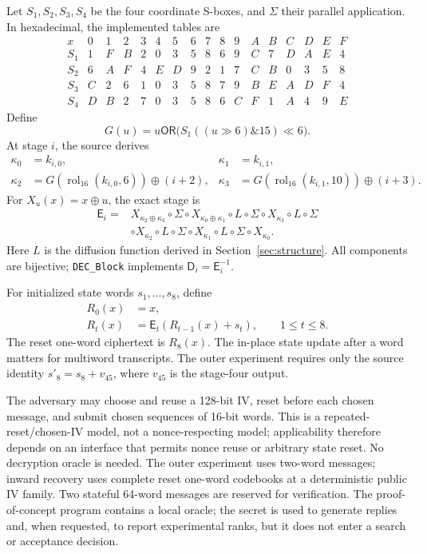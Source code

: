 \documentclass[10pt]{article}
\theoremstyle{plain}
\theoremstyle{definition}
\theoremstyle{remark}
\newcommand{\xor}{\mathbin{\oplus}}
\newcommand{\OR}{\mathbin{\mathsf{OR}}}
\newcommand{\E}{\mathsf E}
\newcommand{\D}{\mathsf D}
\newcommand{\rol}{\operatorname{rol}_{16}}
\newcommand{\code}[1]{\texttt{#1}}
\begin{document}
Let \(S_1,S_2,S_3,S_4\) be the four coordinate S-boxes, and \(\Sigma\) their
parallel application.  In hexadecimal, the implemented tables are
\[
\begin{array}{c|*{16}{c}}
x&0&1&2&3&4&5&6&7&8&9&A&B&C&D&E&F\\\hline
S_1&1&F&B&2&0&3&5&8&6&9&C&7&D&A&E&4\\
S_2&6&A&F&4&E&D&9&2&1&7&C&B&0&3&5&8\\
S_3&C&2&6&1&0&3&5&8&7&9&B&E&A&D&F&4\\
S_4&D&B&2&7&0&3&5&8&6&C&F&1&A&4&9&E
\end{array}
\]
Define
\begin{equation}
G(u)=u\OR\bigl(S_1((u\mathbin{\gg}6)\mathbin{\&}15)\mathbin{\ll}6\bigr).
\label{eq:G}
\end{equation}
At stage \(i\), the source derives
\begin{align}
\kappa_0&=k_{i,0},&\kappa_1&=k_{i,1},\nonumber\\
\kappa_2&=G(\rol(k_{i,0},6))\xor(i+2),&
\kappa_3&=G(\rol(k_{i,1},10))\xor(i+3).
\label{eq:derive}
\end{align}
For \(X_u(x)=x\xor u\), the exact stage is
\begin{align}
\E_i={}&X_{\kappa_2\xor\kappa_3}\circ\Sigma
\circ X_{\kappa_0\xor\kappa_1}\circ L\circ\Sigma
\circ X_{\kappa_3}\circ L\circ\Sigma\nonumber\\
&\circ X_{\kappa_2}\circ L\circ\Sigma
\circ X_{\kappa_1}\circ L\circ\Sigma\circ X_{\kappa_0}.
\label{eq:stage}
\end{align}
Here \(L\) is the diffusion function derived in
Section~\ref{sec:structure}.  All components are bijective;
\code{DEC\_Block} implements \(\D_i=\E_i^{-1}\).

For initialized state words \(s_1,\ldots,s_8\), define
\begin{align}
R_0(x)&=x,\nonumber\\
R_t(x)&=\E_t(R_{t-1}(x)+s_t),\qquad 1\leq t\leq8.
\label{eq:cascade}
\end{align}
The reset one-word ciphertext is \(R_8(x)\).  The in-place state update after
a word matters for multiword transcripts.  The outer experiment requires only
the source identity \(s'_8=s_8+v_{45}\), where \(v_{45}\) is the stage-four
output.

The adversary may choose and reuse a 128-bit IV, reset before each chosen
message, and submit chosen sequences of 16-bit words.  This is a
repeated-reset/chosen-IV model, not a nonce-respecting model; applicability
therefore depends on an interface that permits nonce reuse or arbitrary state
reset.  No decryption oracle is needed.  The outer experiment uses
two-word messages; inward recovery uses complete reset one-word codebooks at
a deterministic public IV family.  Two stateful 64-word messages are reserved
for verification.  The proof-of-concept program contains a local oracle; the
secret is used to generate replies and, when requested, to report experimental
ranks, but it does not enter a search or acceptance decision.
\end{document}
